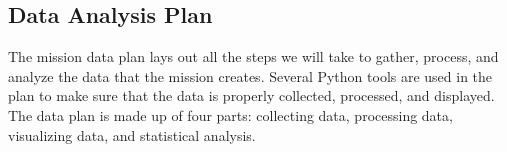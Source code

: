 \subsection{Data Analysis Plan}

The mission data plan lays out all the steps we will take to gather, process, and analyze the data that the mission creates. Several Python tools are used in the plan to make sure that the data is properly collected, processed, and displayed. The data plan is made up of four parts: collecting data, processing data, visualizing data, and statistical analysis.



